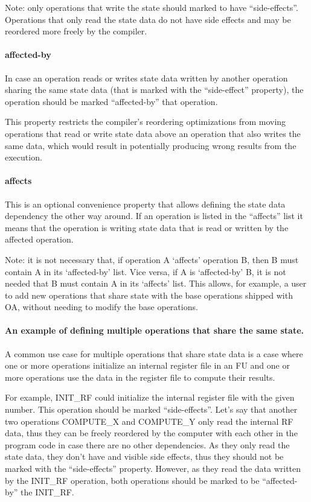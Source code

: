 \documentclass[a4paper,twoside]{tceusermanual}
\begin{document}
Note: only operations that write the state should marked to
have ``side-effects''. Operations that only read the state data do not
have side effects and may be reordered more freely by the compiler.

\paragraph{affected-by}

In case an operation reads or writes state data written by another 
operation sharing the same state data (that is marked with the
``side-effect'' property), the operation should be marked ``affected-by''
that operation. 

This property restricts the compiler's reordering optimizations 
from moving operations that read or write state data above an operation
that also writes the same data, which would result in potentially
producing wrong results from the execution.

\paragraph{affects}

This is an optional convenience property that allows defining
the state data dependency the other way around. If an operation
is listed in the ``affects'' list it means that the operation
is writing state data that is read or written by the affected operation.

Note: it is not necessary that, if operation A `affects' operation B, then B
must contain A in its `affected-by' list.  Vice versa, if A is `affected-by'
B, it is not needed that B must contain A in its `affects' list. This
allows, for example, a user to add new operations that share state with 
the base operations shipped with OA, without needing to modify the base
operations.

\paragraph{An example of defining multiple operations that share the
same state.} A common use case for multiple operations that share
state data is a case where one or more operations initialize an
internal register file in an FU and one or more operations use the
data in the register file to compute their results.

For example, INIT\_RF could initialize the internal register
file with the given number. This operation should be marked
``side-effects''. Let's say that another two operations COMPUTE\_X and
COMPUTE\_Y only read the internal RF data, thus they can be freely
reordered by the computer with each other in the program code in case
there are no other dependencies. As they only read the state data,
they don't have and visible side effects, thus they should not
be marked with the ``side-effects'' property. However, as they read
the data written by the INIT\_RF operation, both operations should
be marked to be ``affected-by'' the INIT\_RF.
\end{document}
